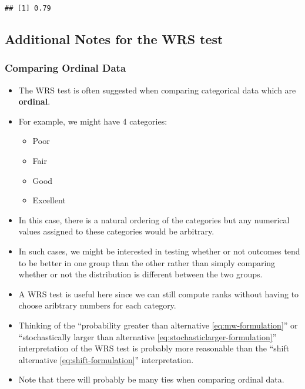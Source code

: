 \documentclass[]{book}
\providecommand{\tightlist}{%
  \setlength{\itemsep}{0pt}\setlength{\parskip}{0pt}}
\begin{document}
\begin{verbatim}
## [1] 0.79
\end{verbatim}

\hypertarget{additional-notes-for-the-wrs-test}{%
\subsection{Additional Notes for the WRS test}\label{additional-notes-for-the-wrs-test}}

\hypertarget{comparing-ordinal-data}{%
\subsubsection{Comparing Ordinal Data}\label{comparing-ordinal-data}}

\begin{itemize}
\item
  The WRS test is often suggested when comparing categorical data which are \textbf{ordinal}.
\item
  For example, we might have 4 categories:

  \begin{itemize}
  \tightlist
  \item
    Poor
  \item
    Fair
  \item
    Good
  \item
    Excellent
  \end{itemize}
\item
  In this case, there is a natural ordering of the categories
  but any numerical values assigned to these categories would be arbitrary.
\item
  In such cases, we might be interested in testing whether or not outcomes tend to be
  better in one group than the other rather than simply comparing whether or not
  the distribution is different between the two groups.
\item
  A WRS test is useful here since we can still compute ranks without having to
  choose aribtrary numbers for each category.
\item
  Thinking of the ``probability greater than alternative \eqref{eq:mw-formulation}''
  or ``stochastically larger than alternative \eqref{eq:stochasticlarger-formulation}'' interpretation
  of the WRS test is probably more reasonable than the ``shift alternative \eqref{eq:shift-formulation}'' interpretation.
\item
  Note that there will probably be many ties when comparing ordinal data.
\end{itemize}
\end{document}

